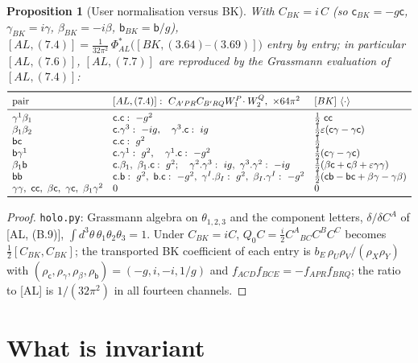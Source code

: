 \documentclass[11pt]{article}
\newtheorem{proposition}[theorem]{Proposition}
\theoremstyle{definition}
\begin{document}
\begin{proposition}[User normalisation versus BK]\label{prop:userBK}
With $C_{BK}=i\,C$ (so $\mathsf c_{BK}=-g\mathsf c$, $\gamma_{BK}=i\gamma$, $\beta_{BK}=-i\beta$, $\mathsf b_{BK}=\mathsf b/g$), $[AL,(7.4)]=\tfrac1{32\pi^2}\,\Phi_{AL}^*\big([BK,(3.64)\text{--}(3.69)]\big)$ entry by entry; in particular $[AL,(7.6)]$, $[AL,(7.7)]$ are reproduced by the Grassmann evaluation of $[AL,(7.4)]$:
{\small
\[
\begin{array}{lll}
\toprule
\text{pair}&[AL,(7.4)]:\ C_{A'PR}C_{B'RQ}W_1^P\!\cdot W_2^Q,\ \times64\pi^2&[BK]\ \langle\cdot\rangle\\\midrule
\gamma^1\beta_1&\mathsf c.\mathsf c:\ -g^2&\tfrac12\ \mathsf c\mathsf c\\
\beta_1\beta_2&\mathsf c.\gamma^3:\ -ig,\quad \gamma^3.\mathsf c:\ ig&\tfrac12\varepsilon(\mathsf c\gamma-\gamma\mathsf c)\\
\mathsf b\mathsf c&\mathsf c.\mathsf c:\ g^2&\tfrac12\\
\mathsf b\gamma^1&\mathsf c.\gamma^1:\ g^2,\quad\gamma^1.\mathsf c:\ -g^2&\tfrac12(\mathsf c\gamma-\gamma\mathsf c)\\
\beta_1\mathsf b&\mathsf c.\beta_1,\ \beta_1.\mathsf c:\ g^2;\quad\gamma^2.\gamma^3:\ ig,\ \gamma^3.\gamma^2:\ -ig&\tfrac12(\beta\mathsf c+\mathsf c\beta+\varepsilon\gamma\gamma)\\
\mathsf b\mathsf b&\mathsf c.\mathsf b:\ g^2,\ \mathsf b.\mathsf c:\ -g^2,\ \gamma^I.\beta_I:\ g^2,\ \beta_I.\gamma^I:\ -g^2&\tfrac12(\mathsf c\mathsf b-\mathsf b\mathsf c+\beta\gamma-\gamma\beta)\\
\gamma\gamma,\ \mathsf c\mathsf c,\ \beta\mathsf c,\ \gamma\mathsf c,\ \beta_1\gamma^2&0&0\\\bottomrule
\end{array}
\]
}
\end{proposition}
\begin{proof}
\texttt{holo.py}: Grassmann algebra on $\theta_{1,2,3}$ and the component letters, $\delta/\delta C^A$ of [AL, (B.9)], $\int d^3\theta\,\theta_1\theta_2\theta_3=1$. Under $C_{BK}=iC$, $Q_0C=\tfrac i2C^A{}_{BC}C^BC^C$ becomes $\tfrac12[C_{BK},C_{BK}]$; the transported BK coefficient of each entry is $b_E\,\rho_U\rho_V/(\rho_X\rho_Y)$ with $(\rho_{\mathsf c},\rho_\gamma,\rho_\beta,\rho_{\mathsf b})=(-g,i,-i,1/g)$ and $f_{ACD}f_{BCE}=-f_{APR}f_{BRQ}$; the ratio to [AL] is $1/(32\pi^2)$ in all fourteen channels.
\end{proof}

\section{What is invariant}
\end{document}
